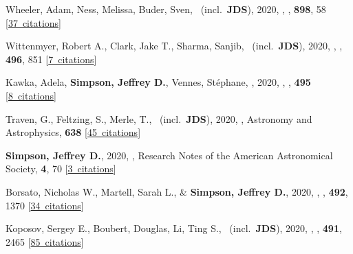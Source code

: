 \item[{\color{numcolor}\scriptsize46}] Wheeler, Adam, Ness, Melissa, Buder, Sven, \etal\ (incl.\ \textbf{JDS}), 2020, , \apj, \textbf{898}, 58 [\href{https://ui.adsabs.harvard.edu/#abs/2020ApJ...898...58W}{37~citations}]

\item[{\color{numcolor}\scriptsize45}] Wittenmyer, Robert A., Clark, Jake T., Sharma, Sanjib, \etal\ (incl.\ \textbf{JDS}), 2020, , \mnras, \textbf{496}, 851 [\href{https://ui.adsabs.harvard.edu/#abs/2020MNRAS.496..851W}{7~citations}]

\item[{\color{numcolor}\scriptsize44}] Kawka, Adela, \textbf{Simpson, Jeffrey D.}, Vennes, St{\'e}phane, \etal, 2020, , \mnras, \textbf{495} [\href{https://ui.adsabs.harvard.edu/#abs/2020MNRAS.495L.129K}{8~citations}]

\item[{\color{numcolor}\scriptsize43}] Traven, G., Feltzing, S., Merle, T., \etal\ (incl.\ \textbf{JDS}), 2020, , Astronomy and Astrophysics, \textbf{638} [\href{https://ui.adsabs.harvard.edu/#abs/2020A&A...638A.145T}{45~citations}]

\item[{\color{numcolor}\scriptsize42}] \textbf{Simpson, Jeffrey D.}, 2020, , Research Notes of the American Astronomical Society, \textbf{4}, 70 [\href{https://ui.adsabs.harvard.edu/#abs/2020RNAAS...4...70S}{3~citations}]

\item[{\color{numcolor}\scriptsize41}] Borsato, Nicholas W., Martell, Sarah L., \& \textbf{Simpson, Jeffrey D.}, 2020, , \mnras, \textbf{492}, 1370 [\href{https://ui.adsabs.harvard.edu/#abs/2020MNRAS.492.1370B}{34~citations}]

\item[{\color{numcolor}\scriptsize40}] Koposov, Sergey E., Boubert, Douglas, Li, Ting S., \etal\ (incl.\ \textbf{JDS}), 2020, , \mnras, \textbf{491}, 2465 [\href{https://ui.adsabs.harvard.edu/#abs/2020MNRAS.491.2465K}{85~citations}]

